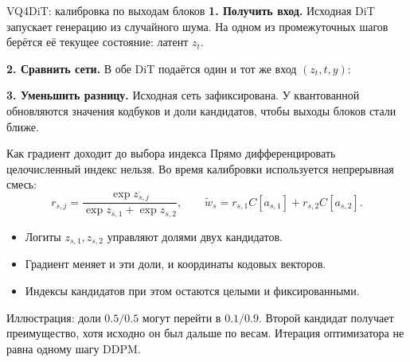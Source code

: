 \documentclass[aspectratio=169,10pt]{beamer}
\newcommand{\takeaway}[1]{\par\vspace{1.5mm}{\bfseries #1\par}}
\newcommand{\smalltext}[1]{{\fontsize{10}{12}\selectfont #1\par}}
\newcommand{\tights}{\setlength{\itemsep}{1.4mm}\setlength{\parsep}{0pt}\setlength{\parskip}{0pt}}
\begin{document}
\begin{frame}[t]{VQ4DiT: калибровка по выходам блоков}
  \textbf{1. Получить вход.} Исходная DiT запускает генерацию из случайного шума.
  На одном из промежуточных шагов берётся её текущее состояние: латент $z_t$.

  \textbf{2. Сравнить сети.} В обе DiT подаётся один и тот же вход $(z_t,t,y)$:
  \begin{center}
  \end{center}
  \textbf{3. Уменьшить разницу.} Исходная сеть зафиксирована. У квантованной
  обновляются значения кодбуков и доли кандидатов, чтобы выходы блоков стали ближе.
  \takeaway{Следующий латент тоже задаётся исходной моделью и DDPM.\par
  Эталон: признаки блоков, не готовые изображения. ImageNet не нужен.}
\end{frame}

\begin{frame}[t]{Как градиент доходит до выбора индекса}
  Прямо дифференцировать целочисленный индекс нельзя.
  Во время калибровки используется непрерывная смесь:
  \[
    r_{s,j}=\frac{\exp z_{s,j}}{\exp z_{s,1}+\exp z_{s,2}},\qquad
    \widetilde w_s=r_{s,1}C[a_{s,1}]+r_{s,2}C[a_{s,2}].
  \]
  \begin{itemize}\tights
    \item Логиты $z_{s,1},z_{s,2}$ управляют долями двух кандидатов.
    \item Градиент меняет и эти доли, и координаты кодовых векторов.
    \item Индексы кандидатов при этом остаются целыми и фиксированными.
  \end{itemize}
  \smalltext{Иллюстрация: доли $0.5/0.5$ могут перейти в $0.1/0.9$.
  Второй кандидат получает преимущество, хотя исходно он был дальше по весам.
  Итерация оптимизатора не равна одному шагу DDPM.}
  \takeaway{Обучается непрерывное предпочтение между кандидатами,\par
  а не производная по самому целочисленному индексу.}
\end{frame}
\end{document}
